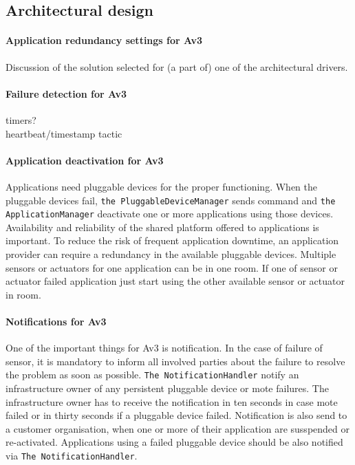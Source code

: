 \subsection{Architectural design}

    \paragraph{Application redundancy settings for Av3}
        Discussion of the solution selected for (a part of) one of the architectural
        drivers.

    \paragraph{Failure detection for Av3}
        timers? \\
        heartbeat/timestamp tactic

    \paragraph{Application deactivation for Av3}
        Applications need pluggable devices for the proper functioning. 
        When the pluggable devices fail, \texttt{the PluggableDeviceManager} sends 
        command and \texttt{the ApplicationManager} deactivate one or more applications 
        using those devices. Availability and reliability of the shared platform offered to applications is 
        important. To reduce the risk of frequent application downtime, 
        an application provider can require a redundancy in the available 
        pluggable devices. Multiple sensors or actuators for one application can be in one room.
        If one of sensor or actuator failed application just start using 
        the other available sensor or actuator in room. 

    \paragraph{Notifications for Av3}
        One of the important things for Av3 is notification. In the case 
        of failure of sensor, it is mandatory to inform all involved parties
         about the failure to resolve the problem as soon as possible. 
        \texttt{The NotificationHandler} notify an infrastructure owner of 
        any persistent pluggable device or mote failures. The infrastructure 
        owner has to receive the notification in ten seconds in case mote failed or 
        in thirty seconds if a pluggable device failed. Notification is also send 
        to a customer organisation, when one or more of their application are 
        susspended or re-activated. Applications using a failed  pluggable 
        device should be also notified via \texttt{The NotificationHandler}.

